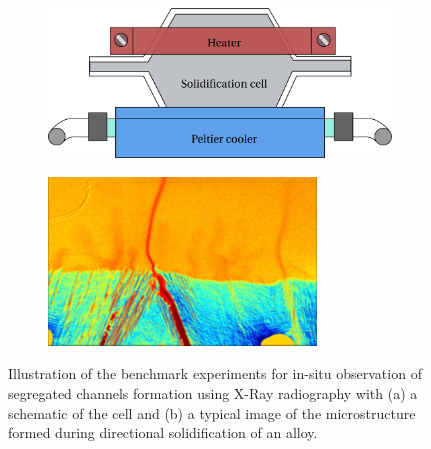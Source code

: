 \begin{figure}[htbp]
\centering
  \begin{subfigure}{0.7\textwidth}
    \centering
	\includegraphics[width=\textwidth]{Chapter4/Graphics/freckle_exp/setup.pdf}
	\caption{}
    \label{fig:experimental_setup}
  \end{subfigure}
  \begin{subfigure}{0.5\textwidth}
    \centering
	\includegraphics[width=\textwidth]{Chapter4/Graphics/freckle_exp/img.png}
	\caption{}
    \label{fig:experimental_img}
  \end{subfigure}
\caption{Illustration of the benchmark experiments for in-situ observation of segregated channels
formation using X-Ray radiography with (a) a schematic of the cell and (b) a typical image 
of the microstructure formed during directional solidification of an  alloy.} 
\label{fig:experimental_freckles}
\end{figure}

